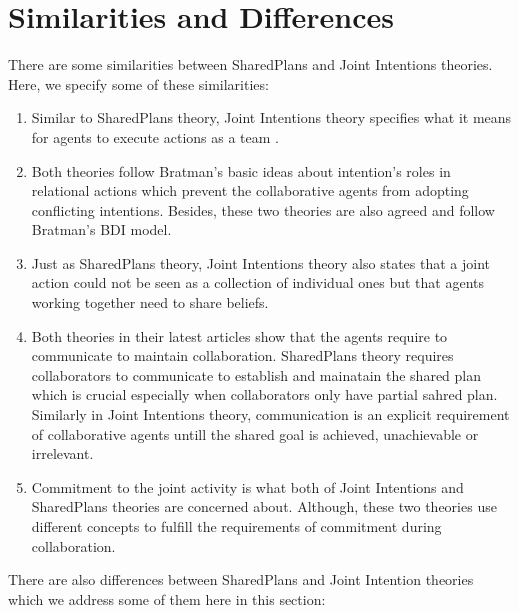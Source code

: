\documentclass[11pt]{article}
\begin{document}
\section{Similarities and Differences}

There are some similarities between SharedPlans and Joint Intentions theories.
Here, we specify some of these similarities:

\begin{enumerate}
  \item Similar to SharedPlans theory, Joint Intentions theory specifies what it
  means for agents to execute actions as a team
  \cite{subramanian:joint-intention-dialogue}.
  
  \item Both theories follow Bratman's basic ideas about intention's roles in
  relational actions which prevent the collaborative agents from adopting
  conflicting intentions. Besides, these two theories are also agreed and follow
  Bratman's BDI model.
  
  \item Just as SharedPlans theory, Joint Intentions theory also states that a
  joint action could not be seen as a collection of individual ones but that
  agents working together need to share beliefs.
  
  \item Both theories in their latest articles show that the agents require to
  communicate to maintain collaboration. SharedPlans theory requires
  collaborators to communicate to establish and mainatain the shared plan which
  is crucial especially when collaborators only have partial sahred plan.
  Similarly in Joint Intentions theory, communication is an explicit requirement
  of collaborative agents untill the shared goal is achieved, unachievable or
  irrelevant.
  
  \item Commitment to the joint activity is what both of Joint Intentions and
  SharedPlans theories are concerned about. Although, these two theories use
  different concepts to fulfill the requirements of commitment during
  collaboration.
\end{enumerate}

There are also differences between SharedPlans and Joint Intention theories
which we address some of them here in this section:
\end{document}
